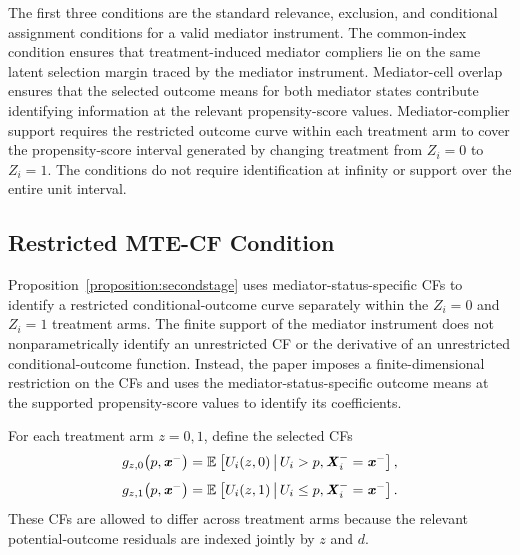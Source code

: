 The first three conditions are the standard relevance, exclusion, and conditional assignment conditions for a valid mediator instrument.
The common-index condition ensures that treatment-induced mediator compliers lie on the same latent selection margin traced by the mediator instrument.
Mediator-cell overlap ensures that the selected outcome means for both mediator states contribute identifying information at the relevant propensity-score values.
Mediator-complier support requires the restricted outcome curve within each treatment arm to cover the propensity-score interval generated by changing treatment from $Z_i=0$ to $Z_i=1$.
The conditions do not require identification at infinity or support over the entire unit interval.

\subsection{Restricted MTE-CF Condition}
\label{appendix:mte-restricted}

Proposition~\ref{proposition:secondstage} uses mediator-status-specific CFs to identify a restricted conditional-outcome curve separately within the $Z_i=0$ and $Z_i=1$ treatment arms.
The finite support of the mediator instrument does not nonparametrically identify an unrestricted CF or the derivative of an unrestricted conditional-outcome function.
Instead, the paper imposes a finite-dimensional restriction on the CFs and uses the mediator-status-specific outcome means at the supported propensity-score values to identify its coefficients.

For each treatment arm $z=0,1$, define the selected CFs
\[
    g_{z,0}
    \big(
        p,\boldsymbol{\mathit{x}}^-
    \big)
    =
    \mathbb{E}_{} \left[ 
        U_i(z,0)
     \, \middle\vert \, 
        U_i>p,
        \boldsymbol{\mathit{X}}_i^-=\boldsymbol{\mathit{x}}^-
     \right],
\]
\[
    g_{z,1}
    \big(
        p,\boldsymbol{\mathit{x}}^-
    \big)
    =
    \mathbb{E}_{} \left[ 
        U_i(z,1)
     \, \middle\vert \, 
        U_i\leq p,
        \boldsymbol{\mathit{X}}_i^-=\boldsymbol{\mathit{x}}^-
     \right].
\]
These CFs are allowed to differ across treatment arms because the relevant potential-outcome residuals are indexed jointly by $z$ and $d$.

